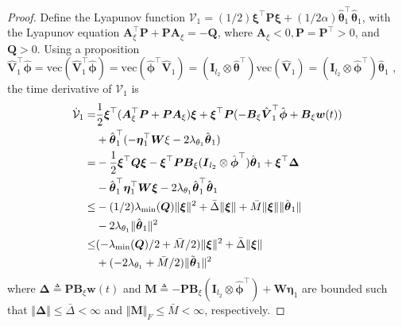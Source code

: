 \documentclass[letterpaper, 10 pt, conference]{ieeeconf}  %
\newcommand*{\mv}[1]{\boldsymbol{#1}}
\newcommand*{\mm}[1]{\boldsymbol{#1}}
\begin{document}
\begin{proof}
Define the Lyapunov function $\mathcal V_1=(1/2)\mv\xi^\top \mm P\mv\xi+(1/2\alpha){\hat{\mv\theta}}_1^\top {\hat{\mv\theta}}_1$, with the Lyapunov equation $\mm A_\xi^\top \mm P+\mm P\mm A_\xi=-\mm Q$, where $\mm A_\xi<0,\mm P=\mm P^\top >0$, and $\mm Q>0$.
Using a proposition $\hat {\mm V}_1^\top \hat{\mv\phi} = \text{vec}(\hat {\mm V}_1^\top \hat{\mv\phi})=\text{vec}(\hat{\mv\phi}^\top \hat {\mm V}_1) = (\mm I_{l_2}\otimes {\hat{\mv\theta}}^\top )\text{vec}(\hat {\mm V}_1)=(\mm I_{l_2}\otimes \hat{\mv\phi}^\top ){\hat{\mv\theta}}_1$ \cite[Proposition~(7.1.9)]{RN22}, the time derivative of $\mathcal V_1$ is
\begin{equation}
    \begin{aligned}
        \dot {\mathcal V}_1 
        =& 
        {1\over 2}
        \mv \xi^\top (\mm A_\xi^\top \mm P+\mm P\mm A_\xi)\mv \xi
        +
        \mv \xi^\top \mm P ( -\mm B_\xi\hat {\mm V}_1^\top \hat {\mv \phi} +\mm B_\xi \mv w(t) )\\
        &
        +{\hat{\mv\theta}}_1^\top 
        (
            -{\mm \eta}_1^\top \mm W \xi-2\lambda_{\theta_1} {\hat{\mv\theta}}_1 
        )
        \\
        =& 
        -{1\over 2}\mv \xi^\top \mm Q\mv \xi 
        -
        \mv \xi^\top \mm P\mm B_\xi(\mm I_{l_2}\otimes \hat{\mv\phi}^\top ){\hat{\mv\theta}}_1 
        +\mv \xi^\top \mv \Delta
        \\
        &
        -{\hat{\mv\theta}}_1^\top {\mm \eta}_1^\top \mm W\mv \xi
        -2\lambda_{\theta_1} {\hat{\mv\theta}}_1^\top {\hat{\mv\theta}}_1
        \\
        \le&
        -(1/2)\lambda_\text{min}(\mm Q)\Vert \mv \xi\Vert ^2
        +\bar\Delta \Vert \mv \xi\Vert  
        +\bar M\Vert \mv \xi\Vert  \Vert {\hat{\mv\theta}}_1\Vert
        \\
        &
        -2\lambda_{\theta_1}
        \Vert{\hat{\mv\theta}}_1\Vert ^2
        \\
        \le& 
        (
        -{\lambda_\text{min}(\mm Q)/ 2} +{\bar M/ 2}
        )
        \Vert \mv \xi\Vert ^2 +\bar\Delta \Vert \mv \xi\Vert  
        \\
        &+ 
        (
        -2\lambda_{\theta_1} 
        +\bar M/ 2
        )
        \Vert \tilde{\mv \theta}_1\Vert ^2 
        \end{aligned}
        \label{eq. lya 1}
\end{equation}
where $\mv \Delta\triangleq \mm P\mm B_\xi \mv w(t)$ and $\mm M\triangleq -\mm P\mm B_\xi(\mm I_{l_2}\otimes \hat{\mv\phi}^\top )+\mm W{\mm \eta}_1$ are bounded such that $\Vert\mv \Delta\Vert\le\bar\Delta<\infty$ and $\Vert\mm M\Vert_F\le \bar M< \infty$, respectively.


\end{proof}
\end{document}
